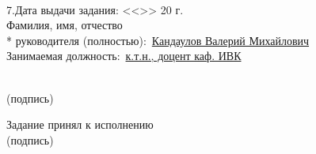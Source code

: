 \begin{titlepage}
\noindent \underline{\hspace{\textwidth}}
\noindent \underline{\hspace{\textwidth}}
\noindent \underline{\hspace{\textwidth}}
\noindent \underline{\hspace{\textwidth}}\\

\noindent 7.Дата выдачи задания: <<\underline{\hspace{1cm}}>>\underline{\hspace{3.5cm}} 20\underline{\hspace{0.8cm}} г.\\

\noindent Фамилия, имя, отчество\\*
руководителя (полностью):~\uline{Кандаулов Валерий Михайлович\hfill}\\
\noindent Занимаемая должность:~\uline{к.т.н., доцент каф. ИВК\hfill}
\begin{flushright}
  \underline{\hspace{5cm}}\\
  \small
  (подпись)\hspace*{1.5cm}
  \normalsize
\end{flushright}


\noindent Задание принял к исполнению~\uline{\hfill}\\
\hspace*{11.5cm}
\small
(подпись)
\normalsize

\restoregeometry

\end{titlepage}
